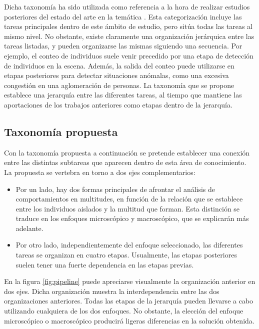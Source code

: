 \documentclass[../main.tex]{memoir}
\begin{document}
Dicha taxonomía ha sido utilizada como referencia a la hora de
realizar estudios posteriores del estado del arte en la temática
\cite{swathi2017crowd}. Esta categorización incluye las tareas
principales dentro de este ámbito de estudio, pero sitúa todas las
tareas al mismo nivel. No obstante, existe claramente una organización
jerárquica entre las tareas listadas, y pueden organizarse las mismas
siguiendo una secuencia. Por ejemplo, el conteo de individuos suele
venir precedido por una etapa de detección de individuos en la escena.
Además, la salida del conteo puede utilizarse en etapas posteriores
para detectar situaciones anómalas, como una excesiva congestión en
una aglomeración de personas. La taxonomía que se propone establece
una jerarquía entre las diferentes tareas, al tiempo que mantiene las
aportaciones de los trabajos anteriores como etapas dentro de la
jerarquía.

\subsection{Taxonomía propuesta}

Con la taxonomía propuesta a continuación se pretende establecer una
conexión entre las distintas subtareas que aparecen dentro de esta
área de conocimiento. La propuesta se vertebra en torno a dos
ejes complementarios:

\begin{itemize}
\item Por un lado, hay dos formas principales de afrontar el análisis
  de comportamientos en multitudes, en función de la relación que se
  establece entre los individuos aislados y la multitud que
  forman. Esta distinción se traduce en los enfoques microscópico y
  macroscópico, que se explicarán más adelante.
\item Por otro lado, independientemente del enfoque seleccionado, las
  diferentes tareas se organizan en cuatro etapas. Usualmente, las
  etapas posteriores suelen tener una fuerte dependencia en las etapas
  previas.
\end{itemize}

En la figura \ref{fig:pipeline} puede apreciarse visualmente la
organización anterior en dos ejes. Dicha organización muestra la
interdependencia entre las dos organizaciones anteriores. Todas las
etapas de la jerarquía pueden llevarse a cabo utilizando cualquiera de
los dos enfoques. No obstante, la elección del enfoque microscópico o
macroscópico producirá ligeras diferencias en la solución obtenida.
\end{document}
